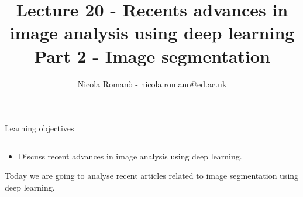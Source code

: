 \documentclass[9pt, aspectratio=169]{beamer}
\author{Nicola Roman\`o - nicola.romano@ed.ac.uk}
\title{Lecture 20 - Recents advances in image analysis using deep learning\\\small Part 2 - Image segmentation}
\date{}
\begin{document}

\begin{frame}
    \titlepage
\end{frame}

\begin{frame}
    {Learning objectives}
    \begin{columns}
        \begin{column}{0.8\textwidth}
            \begin{itemize}
                \item Discuss recent advances in image analysis using deep learning.
            \end{itemize}

            \pause
            \vspace{2em}

            Today we are going to analyse recent articles related to image segmentation using deep learning.


\end{column}
\end{columns}
\end{frame}
\end{document}
